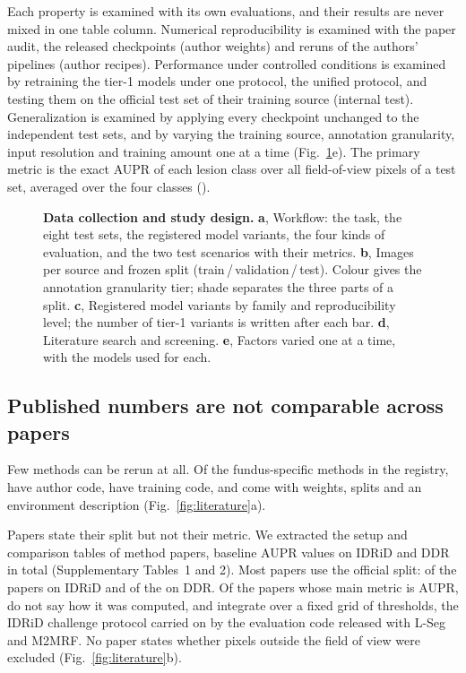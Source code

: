 Each property is examined with its own evaluations, and their results are never mixed in one table column. Numerical reproducibility is examined with the paper audit, the released checkpoints (author weights) and reruns of the authors' pipelines (author recipes). Performance under controlled conditions is examined by retraining the tier-1 models under one protocol, the unified protocol, and testing them on the official test set of their training source (internal test). Generalization is examined by applying every checkpoint unchanged to the independent test sets, and by varying the training source, annotation granularity, input resolution and training amount one at a time (Fig.~\ref{fig:design}e). The primary metric is the exact AUPR of each lesion class over all field-of-view pixels of a test set, averaged over the four classes (\mAUPR).

\begin{figure}[p]
\centering
{}
\caption{\textbf{Data collection and study design.} \textbf{a}, Workflow: the task, the eight test sets, the registered model variants, the four kinds of evaluation, and the two test scenarios with their metrics. \textbf{b}, Images per source and frozen split (train\,/\,validation\,/\,test). Colour gives the annotation granularity tier; shade separates the three parts of a split. \textbf{c}, Registered model variants by family and reproducibility level; the number of tier-1 variants is written after each bar. \textbf{d}, Literature search and screening. \textbf{e}, Factors varied one at a time, with the models used for each.}
\label{fig:design}
\end{figure}




\subsection{Published numbers are not comparable across papers}
Few methods can be rerun at all. Of the  fundus-specific methods in the registry,  have author code,  have training code, and  come with weights, splits and an environment description (Fig.~\ref{fig:literature}a).

Papers state their split but not their metric. We extracted the setup and comparison tables of  method papers,  baseline AUPR values on IDRiD and DDR in total (Supplementary Tables~1 and 2). Most papers use the official split:  of the  papers on IDRiD and  of the  on DDR. Of the  papers whose main metric is AUPR,  do not say how it was computed, and  integrate over a fixed grid of thresholds, the IDRiD challenge protocol carried on by the evaluation code released with L-Seg and M2MRF. No paper states whether pixels outside the field of view were excluded (Fig.~\ref{fig:literature}b).

